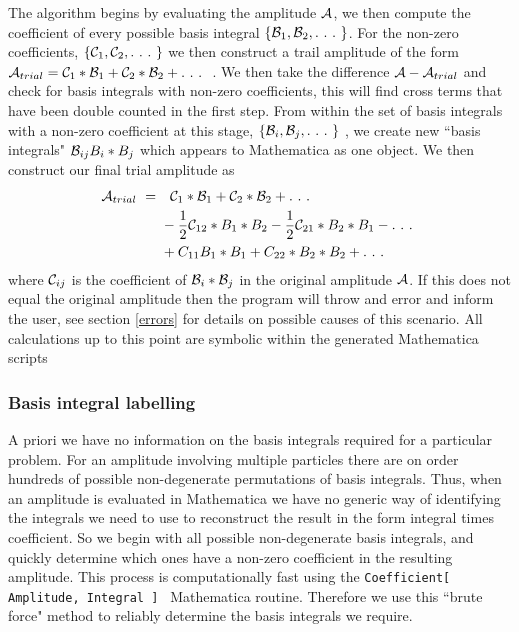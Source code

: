The algorithm begins by evaluating the amplitude $\mathcal{A}$, we then compute the coefficient of every possible basis integral $\{\B_1,\B_2,.\ .\ .\ \}$.  For the non-zero coefficients, $\{\mathcal{C}_1,\mathcal{C}_2, .\ .\ .\  \}$ we then construct a trail amplitude of the form $\mathcal{A}_{trial} = \mathcal{C}_1 * \mathcal{B}_1 + \mathcal{C}_2 * \mathcal{B}_2 + .\ .\ .\ $ .  We then take the difference $\mathcal{A} - \mathcal{A}_{trial}$ and check for basis integrals with non-zero coefficients, this will find cross terms that have been double counted in the first step.  From within the set of basis integrals with a non-zero coefficient at this stage, $\{\mathcal{B}_i,\mathcal{B}_j,.\ .\ .\ \}$ , we create new ``basis integrals" $\mathcal{B}_{ij}  B_i*B_j$ which appears to Mathematica as one object.  We then construct our final trial amplitude as
\begin{align*}
 \A_{trial}\ = \ & \ \ \C_1 * \B_1 + \C_2 * \B_2 + .\ .\ .\ \\ 
  &-\frac{1}{2} \C_{12} * B_1*B_2  -\frac{1}{2} \C_{21} * B_2*B_1 - .\ .\ .\ \\
  & + C_{11} B_1*B_1 + C_{22}*B_2*B_2 + .\ .\ .\ 
\end{align*}
where $ \mathcal{C}_{ij}$ is the coefficient of  $\mathcal{B}_i*\mathcal{B}_j$ in the original amplitude $\mathcal{A}$.  If this does not equal the original amplitude then the program will throw and error and inform the user, see section \ref{errors} for details on possible causes of this scenario.  All calculations up to this point are symbolic within the generated Mathematica scripts

\subsubsection{Basis integral labelling}

A priori we have no information on the basis integrals required for a particular problem.  For an amplitude involving multiple particles there are on order hundreds of possible non-degenerate permutations of basis integrals.  Thus, when an amplitude is evaluated in Mathematica we have no generic way of identifying the integrals we need to use to reconstruct the result in the form integral times coefficient.  So we begin with all possible non-degenerate basis integrals, and quickly determine which ones have a non-zero coefficient in the resulting amplitude.  This process is computationally fast using the \lstinline{Coefficient[ Amplitude, Integral ] } Mathematica routine.  Therefore we use this ``brute force" method to reliably determine the basis integrals we require.

